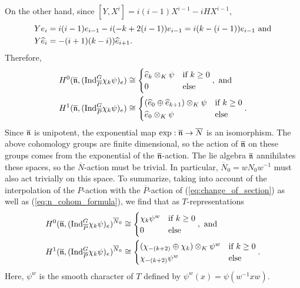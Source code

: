 \documentclass[10pt]{amsart}
\begin{document}
\begin{example}
On the other hand, since $\left[Y,X^{i}\right]=i(i-1)X^{i-1}-iHX^{i-1}$, \begin{align*}
    Ye_{i} &= i(i-1)e_{i-1}-i(-k+2(i-1))e_{i-1} = i(k-(i-1))e_{i-1} \textnormal{ and} \\
    Y\widehat{e}_{i} &= -(i+1)(k-i))\widehat{e}_{i+1}.
\end{align*} Therefore, \begin{align*}
    H^{0}(\overline{\mathfrak{n}},(\textnormal{Ind}_{\overline{P}}^{G}\chi_{k}\psi)_{e}) &\cong \begin{cases}
    \widehat{e}_{k}\otimes_{K}\psi & \text{if } k \geq 0 \\
    0 & \text{else}
    \end{cases},  \text{ and}\\
    H^{1}(\overline{\mathfrak{n}},(\textnormal{Ind}_{\overline{P}}^{G}\chi_{k}\psi)_{e}) &\cong \begin{cases}
    (\widehat{e}_{0}\oplus \widehat{e}_{k+1})\otimes_{K}\psi & \text{if } k \geq 0 \\
    \widehat{e}_{0}\otimes_{K}\psi & \text{else}
    \end{cases}. 
\end{align*} Since $\overline{\mathfrak{n}}$ is unipotent, the exponential map $\exp: \overline{\mathfrak{n}}\rightarrow\overline{N}$ is an isomorphism. The above cohomology groups are finite dimensional, so the action of $\overline{\mathfrak{n}}$ on these groups comes from the exponential of the $\overline{\mathfrak{n}}$-action. The lie algebra $\overline{\mathfrak{n}}$ annihilates these spaces, so the $\overline{N}$-action must be trivial. In particular, $\overline{N}_{0}=wN_{0}w^{-1}$ must also act trivially on this space. To summarize, taking into account of the interpolation of the $P$-action with the $\overline{P}$-action of (\ref{eq:change_of_section}) as well as (\ref{eq:n_cohom_formula}), we find that as $T$-representations \begin{align*}
    H^{0}(\overline{\mathfrak{n}},(\textnormal{Ind}_{\overline{P}}^{G}\chi_{k}\psi)_{e})^{\overline{N}_{0}} &\cong \begin{cases}
    \chi_{k}\psi^{w} & \text{if } k \geq 0 \\
    0 & \text{else}
    \end{cases}, \text{ and} \\
    H^{1}(\overline{\mathfrak{n}},(\textnormal{Ind}_{\overline{P}}^{G}\chi_{k}\psi)_{e})^{\overline{N}_{0}} &\cong \begin{cases}
    (\chi_{-(k+2)}\oplus \chi_{k})\otimes_{K}\psi^{w} & \text{if } k \geq 0 \\
    \chi_{-(k+2)}\psi^{w} & \text{else}
    \end{cases}. 
\end{align*} Here, $\psi^{w}$ is the smooth character of $T$ defined by $\psi^{w}(x)=\psi(w^{-1}xw)$.


\end{example}
\end{document}
